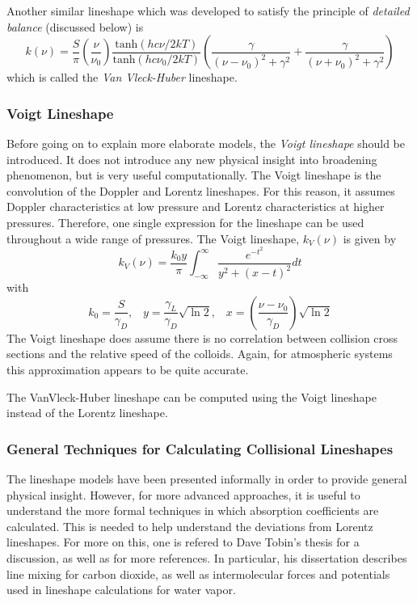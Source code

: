 \documentclass[11pt]{article}
\begin{document}
Another similar lineshape which was developed to satisfy the principle of
{\it detailed balance} (discussed below) is\cite{van:77}
\begin{equation}
k(\nu)=\frac{S}{\pi}\left(\frac{\nu}{\nu_0}\right)
\frac{\mbox{tanh}(hc\nu/2kT)}{\mbox{tanh}(hc\nu_0/2kT)}
\left(\frac{\gamma}{(\nu-\nu_0)^{2}+\gamma^{2}}
+ \frac{\gamma}{(\nu+\nu_0)^{2}+\gamma^{2}}\right)
\label{eqn:vvh}
\end{equation}
which is called the {\it Van Vleck-Huber} lineshape.

\subsubsection{Voigt Lineshape }\label{sec:voigt}

Before going on to explain more elaborate models,
the {\it Voigt lineshape} should be introduced.  It does not
introduce any new physical insight into broadening phenomenon, but is very
useful computationally.  The Voigt lineshape is the convolution of the
Doppler and Lorentz lineshapes.  For this reason, it assumes Doppler
characteristics at low pressure and Lorentz characteristics at higher
pressures.  Therefore, one single expression for the lineshape can be used
throughout a wide range of pressures.  The Voigt lineshape, $k_{V}(\nu)$
is given by
\begin{equation}
 k_{V}(\nu)=\frac{k_{0}y}{\pi}\int_{-\infty}^{\infty} \frac{e^{-t^{2}}}
{y^{2} + (x-t)^{2}}dt
\end{equation}
with
\begin{equation}
 k_{0}=\frac{S}{\gamma_{D}}, \; \; \;
y=\frac{\gamma_{L}}{\gamma_{D}}\sqrt{\ln 2}, \; \; \;
x=\left(\frac{\nu-\nu_{0}}{\gamma_{D}}\right)\sqrt{\ln 2}
\end{equation}
The Voigt lineshape does assume there is no correlation between collision
cross sections and the relative speed of the colloids.  Again, for
atmospheric systems this approximation appears to be quite accurate.

The VanVleck-Huber lineshape can be computed using the Voigt lineshape 
instead of the Lorentz lineshape.

\subsubsection{General Techniques for Calculating Collisional
Lineshapes }\label{sec:gentechs}

The lineshape models have been presented informally in order to provide 
general physical insight.  However,
for more advanced approaches, it is useful to understand the more formal
techniques in which absorption coefficients are calculated.  This is needed
to help understand the deviations from Lorentz lineshapes. For more on 
this, one is refered to Dave Tobin's \cite{tob:96} thesis for a 
discussion, as well as for more references. In particular, his 
dissertation describes line mixing for carbon dioxide, as well as 
intermolecular forces and potentials used in lineshape calculations for 
water vapor.
\end{document}
